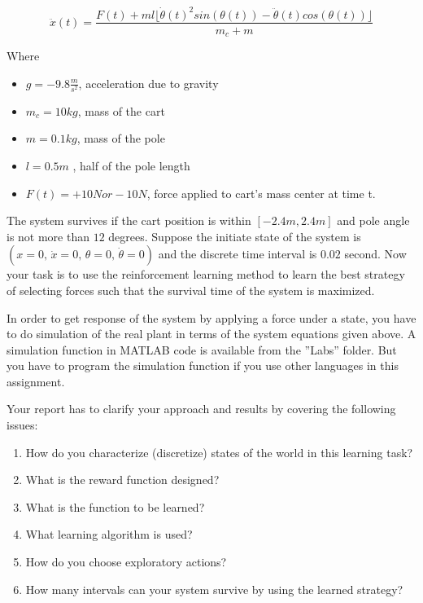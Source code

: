 \documentclass[12pt,a4paper]{article}
\makeatletter
\newcommand\mynobreakpar{\par\nobreak\@afterheading}
\makeatother
\begin{document}
$$
\ddot{x}(t) = \frac{F(t) + ml \lfloor \dot\theta(t)^2 sin(\theta(t)) - \ddot{\theta}(t) cos(\theta(t))\rfloor}
                   {m_c + m}
$$

\noindent
Where\mynobreakpar
\begin{itemize}

	\item[] $g = -9.8 \frac{m}{s^2}$, acceleration due to gravity
	\item[] $m_c = 10 kg$, mass of the cart
	\item[] $m = 0.1 kg$, mass of the pole
	\item[] $l = 0.5 m$ , half of the pole length
	\item[] $F(t) = +10 N or -10 N$, force applied to cart’s mass center at time t.

\end{itemize}

The system survives if the cart position is within $[-2.4 m, 2.4 m]$ and pole angle is not more
than $12$ degrees. Suppose the initiate state of the system is $(x=0,\, \dot x=0,\, \theta=0,\, \dot \theta=0)$ and the 
discrete time interval is $0.02$ second. Now your task is to use the reinforcement learning
method to learn the best strategy of selecting forces such that the survival time of the system
is maximized.


In order to get response of the system by applying a force under a state, you have to do
simulation of the real plant in terms of the system equations given above. A simulation
function in MATLAB code is available from the ''Labs'' folder. But you have to program the
simulation function if you use other languages in this assignment.


Your report has to clarify your approach and results by covering the following issues:

\begin{enumerate}

	\item How do you characterize (discretize) states of the world in this learning task?
	\item What is the reward function designed?
	\item What is the function to be learned?
	\item What learning algorithm is used?
	\item How do you choose exploratory actions?
	\item How many intervals can your system survive by using the learned strategy?

\end{enumerate}
\end{document}
